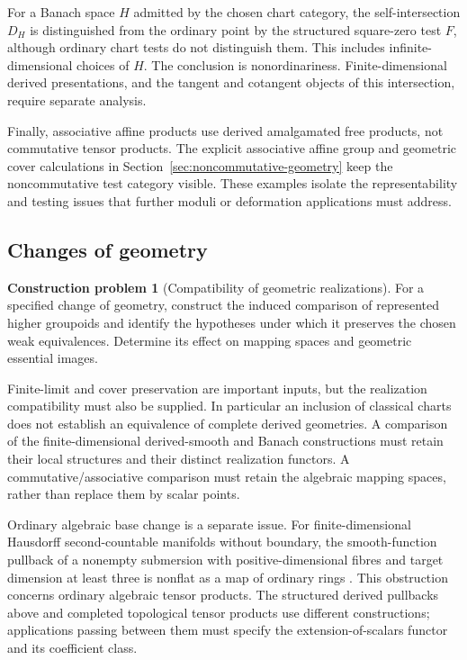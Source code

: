 \documentclass[12pt]{amsart}
\theoremstyle{definition}
\newtheorem{construction}[thm]{Construction problem}
\theoremstyle{remark}
\numberwithin{equation}{section}
\begin{document}
For a Banach space $H$ admitted by the chosen chart category,
the self-intersection $D_H$ is distinguished from the ordinary
point by the structured square-zero test $F$, although ordinary
chart tests do not distinguish them. This includes
infinite-dimensional choices of $H$. The conclusion is
nonordinariness. Finite-dimensional derived presentations,
and the tangent and cotangent objects of this intersection,
require separate analysis.

Finally, associative affine products use
derived amalgamated free products, not
commutative tensor products. The explicit
associative affine group and geometric
cover calculations in
Section~\ref{sec:noncommutative-geometry}
keep the noncommutative test category visible.
These examples isolate the representability and testing
issues that further moduli or deformation applications
must address.

\subsection{Changes of geometry}

\begin{construction}[Compatibility of geometric realizations]
\label{problem:change-of-geometry}
For a specified change of geometry, construct
the induced comparison of represented higher
groupoids and identify the hypotheses under
which it preserves the chosen weak equivalences.
Determine its effect on mapping spaces and
geometric essential images.
\end{construction}

Finite-limit and cover preservation are
important inputs, but the realization
compatibility must also be supplied.
In particular an inclusion of classical
charts does not establish an equivalence
of complete derived geometries.
A comparison of the finite-dimensional
derived-smooth and Banach constructions
must retain their local structures
and their distinct realization functors.
A commutative/associative comparison must
retain the algebraic mapping spaces,
rather than replace them by scalar points.

Ordinary algebraic base change is a separate issue.
For finite-dimensional Hausdorff second-countable manifolds
without boundary, the smooth-function pullback of a nonempty
submersion with positive-dimensional fibres and target
dimension at least three is nonflat as a map of ordinary rings
\cite[Corollary~7.7]{ZengSubmersion2026}.
This obstruction concerns ordinary algebraic tensor products.
The structured derived pullbacks above and completed
topological tensor products use different constructions;
applications passing between them must specify the
extension-of-scalars functor and its coefficient class.
\end{document}
